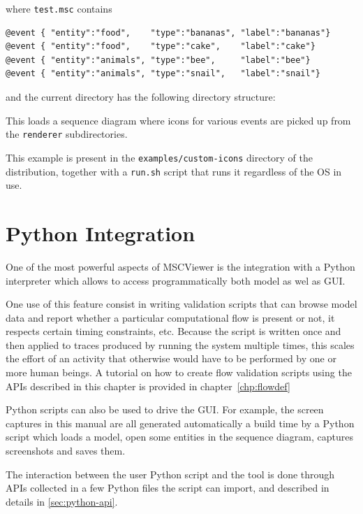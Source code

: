 \documentclass[11pt, twoside, titlepage]{book}
\newcommand{\prog}{MSCViewer}
\begin{document}
\noindent where \texttt{test.msc} contains

\begin{lstlisting}
@event { "entity":"food",    "type":"bananas", "label":"bananas"}
@event { "entity":"food",    "type":"cake",    "label":"cake"}
@event { "entity":"animals", "type":"bee",     "label":"bee"}
@event { "entity":"animals", "type":"snail",   "label":"snail"}
\end{lstlisting}

\noindent and the current directory has the following directory structure:


This loads a sequence diagram where icons for various events are picked up from the \texttt{renderer}
subdirectories.

This example is present in the \texttt{examples/custom-icons} directory of the distribution, together with 
a \texttt{run.sh} script that runs it regardless of the OS in use.

\chapter{Python Integration}
One of the most powerful aspects of \prog{} is the integration with a Python interpreter
which allows to access programmatically both model as wel as GUI.

One use of this feature
consist in writing validation scripts that can browse model data and report whether a 
particular computational flow is present or not, it respects certain timing constraints, etc. 
Because the script is written once and then applied to traces produced by running the 
system multiple times, this scales the effort of an activity that otherwise would have to be
performed by one or more human beings. A tutorial on how to create flow validation scripts
using the APIs described in this chapter is provided in chapter~\ref{chp:flowdef} 

Python scripts can also be used to drive the GUI. For example, the screen captures in this 
manual are all generated automatically a build time by a Python script which loads a model,
open some entities in the sequence diagram, captures screenshots and saves them.

The interaction between the user Python script and the tool is done through APIs 
collected in a few Python files the script can import, and described in details 
in \ref{sec:python-api}.
\end{document}
